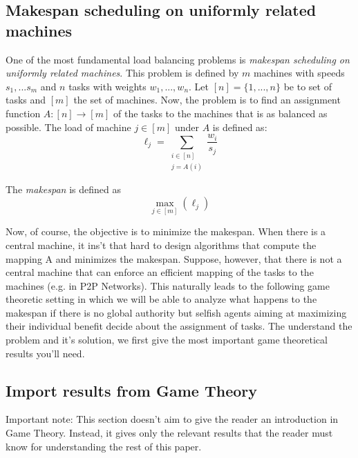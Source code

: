 \documentclass[a4paper,11pt]{article}
\begin{document}
\subsection{Makespan scheduling on uniformly related machines}
 One of the most fundamental load balancing problems is \emph{makespan scheduling on uniformly related machines}. This problem is defined by $m$ machines with speeds $s_1,...s_m$ and $n$ tasks with weights $w_1,...,w_n$. Let $[n] = \{1,...,n\}$ be to set of tasks and $[m]$ the set of machines. Now, the problem is to find an assignment function $A: [n] \rightarrow [m]$ of the tasks to the machines that is as balanced as possible. The load of machine $j \in [m]$ under $A$ is defined as:
\begin{displaymath}
  \ell_j = \displaystyle\sum_{\substack{i \in [n] \\j = A(i)}}{\frac{w_i}{s_j}}
\end{displaymath}

The \emph{makespan} is defined as $$\max\limits_{j \in [m]}(\ell_j)$$

Now, of course, the objective is to minimize the makespan. When there is a central machine, it ins't that hard to design algorithms that compute the mapping A and minimizes the makespan. Suppose, however, that there is not a central machine that can enforce an efficient mapping of the tasks to the machines (e.g. in P2P Networks). This naturally leads to the following game theoretic setting in which we will be able to analyze what happens to the makespan if there is no global authority but selfish agents aiming at maximizing their individual benefit decide about the assignment of tasks. The understand the problem and it's solution, we first give the most important game theoretical results you'll need.

\subsection{Import results from Game Theory}
Important note: This section doesn't aim to give the reader an introduction in Game Theory. Instead, it gives only the relevant results that the reader must know for understanding the rest of this paper.
\end{document}
